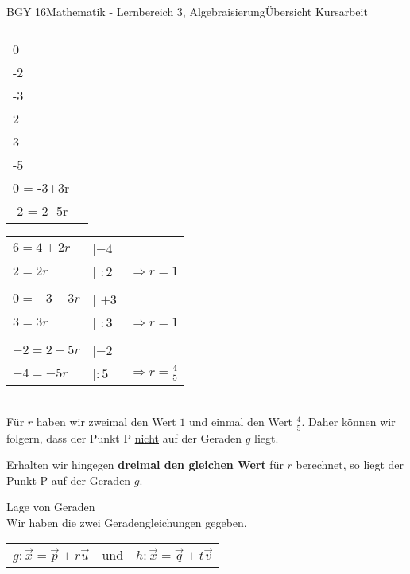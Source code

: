\documentclass[oneside,openany,headings=optiontotoc,11pt,numbers=noenddot]{scrreprt}
\begin{document}
\begin{worksheet}{BGY 16}{Mathematik - Lernbereich 3, Algebraisierung}{Übersicht Kursarbeit}
\begin{framed}
\begin{tabularx}{\textwidth}{Xl}
				\(\left(\begin{array}{c}6\\0\\-2\end{array}\right) = \left(\begin{array}{c}4\\-3\\2\end{array}\right) + r*\left(\begin{array}{c}2\\3\\-5\end{array}\right)\) & \(\Rightarrow \begin{array}{c}6 = 4+2r\\0 = -3+3r\\-2 = 2 -5r\end{array}\)\\
			\end{tabularx}
			\begin{tabularx}{\textwidth}{lll}
				\hline
				\(6 = 4+2r\) & |\(-4\)\\
				\(2 = 2r\)& | \(:2\)& \(\Rightarrow r = 1\)\\
				\\
				\(0 = -3 +3r\) & | \(+3\)\\
				\(3 = 3r\) & | \(:3\) & \(\Rightarrow r = 1\)\\
				\\
				\(-2 = 2-5r\) & |\(-2\)\\
				\(-4 = -5r\) & |\(:5\) & \(\Rightarrow r = \frac{4}{5}\)
			\end{tabularx}\\
			Für \(r\) haben wir zweimal den Wert \(1\) und einmal den Wert \(\frac{4}{5}\). Daher können wir folgern, dass der Punkt P \underline{nicht} auf der Geraden \(g\) liegt.\\
			\par\bigskip\noindent
			Erhalten wir hingegen \textbf{dreimal den gleichen Wert} für \(r\) berechnet, so liegt der Punkt P auf der Geraden \(g\).
		\end{framed}
		\begin{framed}
			\noindent
			\tiny{\color{codegray}Lage von Geraden}\normalcolor\normalsize\\
			Wir haben die zwei Geradengleichungen gegeben.
			\begin{center}
				\begin{tabularx}{\textwidth}{XlX}
					\(g: \vec{x} = \vec{p} + r\vec{u}\) & und & \(h: \vec{x} = \vec{q} + t\vec{v}\)

\end{tabularx}
\end{center}
\end{framed}
\end{worksheet}
\end{document}
